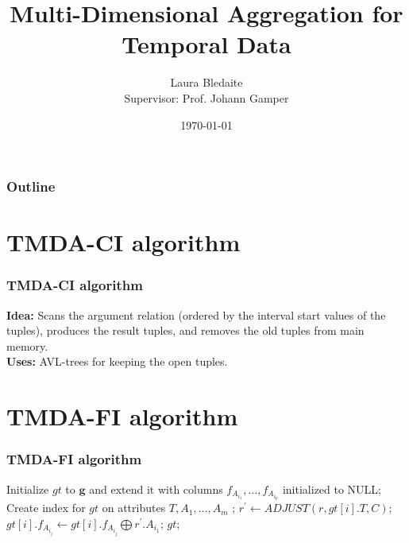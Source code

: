 \documentclass[]{beamer}
\title{Multi-Dimensional Aggregation for Temporal Data}    %
\author{Laura Bledaite\\ Supervisor: Prof. Johann Gamper}                 %
\institute{Free University of Bozen - Bolzano}      %
\date{\today}                    %
\renewcommand{\vec}[1]{\mathbf{#1}}
\begin{document}
\begin{frame}
  \titlepage
\end{frame}


\section[Outline]{}

\begin{frame}
  \frametitle{Outline}
  \tableofcontents
\end{frame}


\section{TMDA-CI algorithm}

\begin{frame}
 
\frametitle{TMDA-CI algorithm}   %

\textbf{Idea:} Scans the argument relation (ordered by the interval start values of the tuples), produces the result tuples, and removes the old tuples from main memory.\\

\textbf{Uses: } AVL-trees for keeping the open tuples.
\end{frame}


\section{TMDA-FI algorithm}
\begin{frame}
  \frametitle{TMDA-FI algorithm}   %

\begin{algorithmic}
\STATE Initialize $gt$ to $\vec{g}$ and extend it with columns $f_{A_{i_1}} , \dots , f_{A_{i_p}}$ initialized to NULL;
\STATE Create index for $gt$ on attributes $T, A_1,\dots,A_m$ ;
\FORALL{tuple $r \in \vec{r}$} 
\STATE $r^{'} \leftarrow ADJUST(r, gt[i].T, C)$; 
\FORALL{$f_j \in \vec{F}$}
\STATE $gt[i].f_{A_{i_j}} \leftarrow gt[i].f_{A_{i_j}} \bigoplus r^{'}.A_{i_1}$; 
\ENDFOR
\ENDFOR
\ENDFOR
\RETURN $gt$;
\end{algorithmic}

\end{frame}
\end{document}

